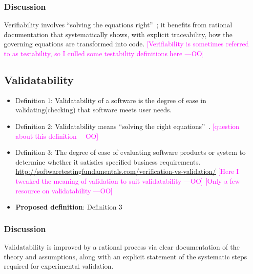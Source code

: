 \documentclass[letterpaper,cleveref]{lipics-v2019}
\newcommand{\authornote}[3]{\textcolor{#1}{[#3 ---#2]}}
\newcommand{\authornote}[3]{}
\newcommand{\oo}[1]{\authornote{magenta}{OO}{#1}} %
\theoremstyle{definition}
\begin{document}
\subsubsection{Discussion}
Verifiability involves ``solving the equations right''~\cite[p.~23]{Roache1998};
it benefits from rational documentation that systematically shows, with explicit
traceability, how the governing equations are transformed into code.
\oo{Verifiability is sometimes referred to as testability, so I culled some
  testability definitions here}

\subsection{Validatability}

\begin{itemize}
\item{Definition 1:} Validatability of a software is the degree of ease in
  validating(checking) that software meets user needs.
\item{Definition 2:} Validatability means ``solving the right equations''~\cite[p.~23]{Roache1998}.
\oo{question about this definition}
\item{Definition 3:} The degree of ease of evaluating software products or
  system to determine whether it satisfies specified business
  requirements. \url{http://softwaretestingfundamentals.com/verification-vs-validation/}
  \oo{Here I tweaked the meaning of validation to suit validatability}
  \oo{Only a few resource on validatability}
\item{\textbf{Proposed definition}:} Definition 3
\end{itemize}

\subsubsection{Discussion}

Validatability is improved by a rational process via clear documentation of the
theory and assumptions, along with an explicit statement of the systematic steps
required for experimental validation.
\end{document}
